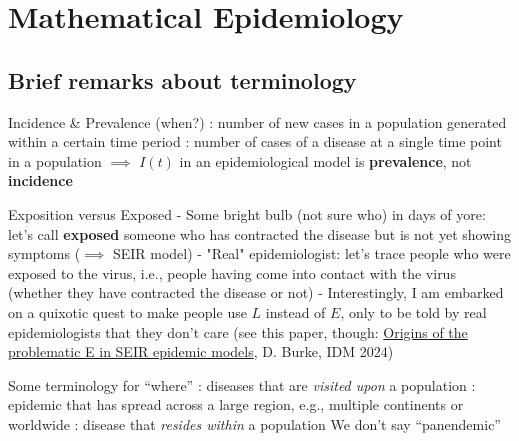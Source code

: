 \documentclass[aspectratio=169]{beamer}\usepackage[]{graphicx}\usepackage[]{xcolor}
\begin{document}
\section{Mathematical Epidemiology}

\subsection{Brief remarks about terminology}


\begin{frame}{Incidence \& Prevalence (when?)}
: number of new cases in a population generated within a certain time period
\vfill
{}: number of cases of a disease at a single time point in a population
\vfill
$\implies$ $I(t)$ in an epidemiological model is \textbf{prevalence}, not \textbf{incidence}
\end{frame}

\begin{frame}{Exposition versus Exposed}
- Some bright bulb (not sure who) in days of yore: let's call \textbf{exposed} someone who has contracted the disease but is not yet showing symptoms ($\implies$ SEIR model)
\vfill
- "Real" epidemiologist: let's trace people who were exposed to the virus, i.e., people having come into contact with the virus (whether they have contracted the disease or not)
\vfill
- Interestingly, I am embarked on a quixotic quest to make people use $L$ instead of $E$, only to be told by real epidemiologists that they don't care \code{:)} (see this paper, though: \href{https://doi.org/10.1016/j.idm.2024.03.003}{Origins of the problematic E in SEIR epidemic models}, D. Burke, IDM 2024)
\end{frame}




\begin{frame}{Some terminology for ``where''}
\bbullet {}: diseases that are \emph{visited upon} a population
\vfill
\bbullet {}: epidemic that has spread across a large region, e.g., multiple continents or worldwide
\vfill
\bbullet {}: disease that \emph{resides within} a population
\vfill
\bbullet We don't say ``panendemic''
\end{frame}
\end{document}
